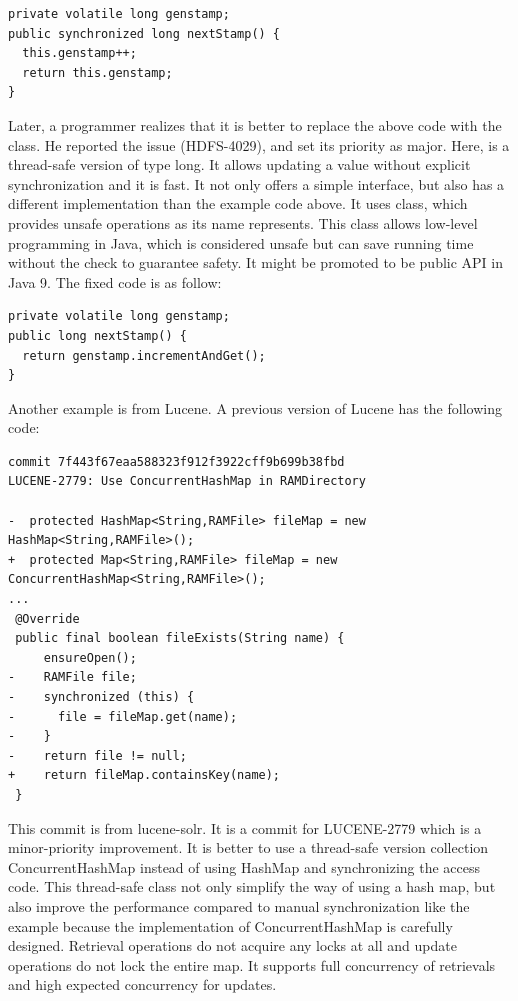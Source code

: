 \begin{lstlisting}
private volatile long genstamp;
public synchronized long nextStamp() {
  this.genstamp++;
  return this.genstamp;
}
\end{lstlisting}

Later, a programmer realizes that it is better to replace the above code with the  class. He reported the issue (HDFS-4029), and set its priority as major. Here,  is a thread-safe version of type long. It allows updating a  value without explicit synchronization and it is fast. It not only offers a simple interface, but also has a different implementation than the example code above. It uses  class, which provides unsafe operations as its name represents. This class allows low-level programming in Java, which is considered unsafe but can save running time without the check to guarantee safety. It might be promoted to be public API in Java 9. The fixed code is as follow:


\begin{lstlisting}
private volatile long genstamp;
public long nextStamp() {
  return genstamp.incrementAndGet();
}
\end{lstlisting}

Another example is from Lucene. A previous version of Lucene has the following code:

\begin{lstlisting}
commit 7f443f67eaa588323f912f3922cff9b699b38fbd
LUCENE-2779: Use ConcurrentHashMap in RAMDirectory

-  protected HashMap<String,RAMFile> fileMap = new HashMap<String,RAMFile>();
+  protected Map<String,RAMFile> fileMap = new ConcurrentHashMap<String,RAMFile>();
...
 @Override
 public final boolean fileExists(String name) {
     ensureOpen();
-    RAMFile file;
-    synchronized (this) {
-      file = fileMap.get(name);
-    }
-    return file != null;
+    return fileMap.containsKey(name);
 }
\end{lstlisting}

This commit is from lucene-solr. It is a commit for LUCENE-2779 which is a minor-priority improvement. It is better to use a thread-safe version collection ConcurrentHashMap instead of using HashMap and synchronizing the access code. This thread-safe class not only simplify the way of using a hash map, but also improve the performance compared to manual synchronization like the example because the implementation of ConcurrentHashMap is carefully designed. Retrieval operations do not acquire any locks at all and update operations do not lock the entire map. It supports full concurrency of retrievals and high expected concurrency for updates.

